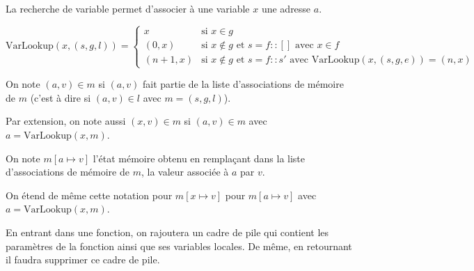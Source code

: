 \begin{definition}

  La recherche de variable permet d'associer à une variable $x$ une adresse $a$.

  \[
    \mathrm{VarLookup} (x, (s, g, l)) =
      \begin{cases}
        x      & \mbox{si } x ∈ g \\
      (0, x)   & \mbox{si } x ∉ g \mbox{ et } s = f::[]
                 \mbox{ avec } x ∈ f \\
      (n+1, x) & \mbox{si } x ∉ g \mbox{ et } s = f::s'
                 \mbox{ avec } \mathrm{VarLookup} (x, (s, g, e)) = (n, x)
      \end{cases}
  \]

\end{definition}

\begin{definition}

  On note $(a, v) ∈ m$ si $(a, v)$ fait partie de la liste d'associations de
  mémoire de $m$ (c'est à dire si $(a, v) ∈ l$ avec $m = (s, g, l)$).

  Par extension, on note aussi $(x, v) ∈ m$ si $(a, v) ∈ m$ avec $a =
  \mathrm{VarLookup}(x, m)$.

  On note $m[a ↦ v]$ l'état mémoire obtenu en remplaçant dans la liste
  d'associations de mémoire de $m$, la valeur associée à $a$ par $v$.

  On étend de même cette notation pour $m[x ↦ v]$ pour $m[a ↦ v]$ avec
  $a = \mathrm{VarLookup}(x, m)$.

\end{definition}

En entrant dans une fonction, on rajoutera un cadre de pile qui contient les
paramètres de la fonction ainsi que ses variables locales. De même, en
retournant il faudra supprimer ce cadre de pile.

